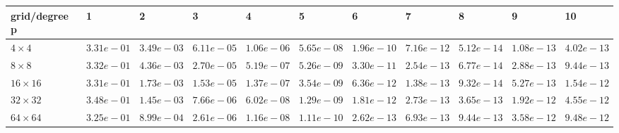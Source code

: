 \begin{tabular}{lllllllllll}
\hline
 grid/degree p   & 1          & 2          & 3          & 4          & 5          & 6          & 7          & 8          & 9          & 10         \\
\hline
 $4 \times 4$    & $3.31e-01$ & $3.49e-03$ & $6.11e-05$ & $1.06e-06$ & $5.65e-08$ & $1.96e-10$ & $7.16e-12$ & $5.12e-14$ & $1.08e-13$ & $4.02e-13$ \\
 $8 \times 8$    & $3.32e-01$ & $4.36e-03$ & $2.70e-05$ & $5.19e-07$ & $5.26e-09$ & $3.30e-11$ & $2.54e-13$ & $6.77e-14$ & $2.88e-13$ & $9.44e-13$ \\
 $16 \times 16$  & $3.31e-01$ & $1.73e-03$ & $1.53e-05$ & $1.37e-07$ & $3.54e-09$ & $6.36e-12$ & $1.38e-13$ & $9.32e-14$ & $5.27e-13$ & $1.54e-12$ \\
 $32 \times 32$  & $3.48e-01$ & $1.45e-03$ & $7.66e-06$ & $6.02e-08$ & $1.29e-09$ & $1.81e-12$ & $2.73e-13$ & $3.65e-13$ & $1.92e-12$ & $4.55e-12$ \\
 $64 \times 64$  & $3.25e-01$ & $8.99e-04$ & $2.61e-06$ & $1.16e-08$ & $1.11e-10$ & $2.62e-13$ & $6.93e-13$ & $9.44e-13$ & $3.58e-12$ & $9.48e-12$ \\
\hline
\end{tabular}
